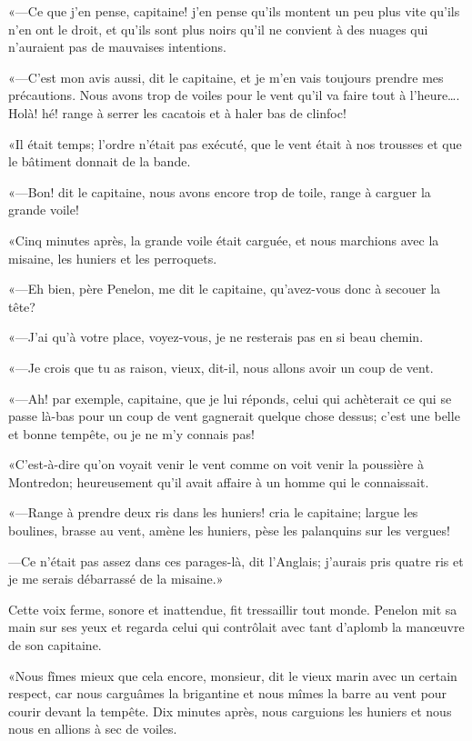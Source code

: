«—Ce que j'en pense, capitaine! j'en pense qu'ils montent un peu plus vite qu'ils n'en ont le droit, et qu'ils sont plus noirs qu'il ne convient à des nuages qui n'auraient pas de mauvaises intentions.

«—C'est mon avis aussi, dit le capitaine, et je m'en vais toujours prendre mes précautions. Nous avons trop de voiles pour le vent qu'il va faire tout à l'heure\dots. Holà! hé! range à serrer les cacatois et à haler bas de clinfoc!

«Il était temps; l'ordre n'était pas exécuté, que le vent était à nos trousses et que le bâtiment donnait de la bande.

«—Bon! dit le capitaine, nous avons encore trop de toile, range à carguer la grande voile!

«Cinq minutes après, la grande voile était carguée, et nous marchions avec la misaine, les huniers et les perroquets.

«—Eh bien, père Penelon, me dit le capitaine, qu'avez-vous donc à secouer la tête?

«—J'ai qu'à votre place, voyez-vous, je ne resterais pas en si beau chemin.

«—Je crois que tu as raison, vieux, dit-il, nous allons avoir un coup de vent.

«—Ah! par exemple, capitaine, que je lui réponds, celui qui achèterait ce qui se passe là-bas pour un coup de vent gagnerait quelque chose dessus; c'est une belle et bonne tempête, ou je ne m'y connais pas!

«C'est-à-dire qu'on voyait venir le vent comme on voit venir la poussière à Montredon; heureusement qu'il avait affaire à un homme qui le connaissait.

«—Range à prendre deux ris dans les huniers! cria le capitaine; largue les boulines, brasse au vent, amène les huniers, pèse les palanquins sur les vergues!

—Ce n'était pas assez dans ces parages-là, dit l'Anglais; j'aurais pris quatre ris et je me serais débarrassé de la misaine.»

Cette voix ferme, sonore et inattendue, fit tressaillir tout monde. Penelon mit sa main sur ses yeux et regarda celui qui contrôlait avec tant d'aplomb la manœuvre de son capitaine.

«Nous fîmes mieux que cela encore, monsieur, dit le vieux marin avec un certain respect, car nous carguâmes la brigantine et nous mîmes la barre au vent pour courir devant la tempête. Dix minutes après, nous carguions les huniers et nous nous en allions à sec de voiles.

